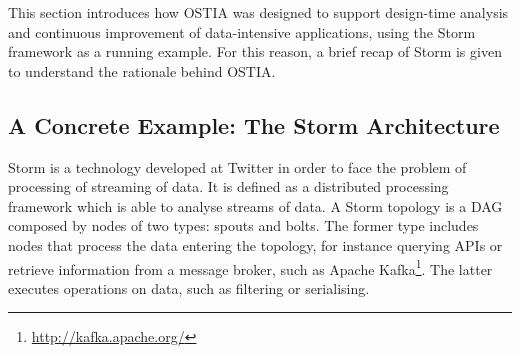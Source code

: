 

This section introduces how OSTIA was designed to support design-time analysis and continuous improvement of data-intensive applications, using the Storm framework as a running example.
For this reason, a brief recap of Storm is given to understand the rationale behind OSTIA.

\subsection{A Concrete Example: The Storm Architecture}

Storm is a technology developed at Twitter \cite{toshniwal2014storm} in order to
face the problem of processing of streaming of data. It is defined as a
distributed processing framework which is able to analyse streams of data. A Storm topology is a DAG composed by nodes of two types: spouts and bolts. The former type includes nodes that process the data entering the topology, for instance
querying APIs or retrieve information from a message broker, such as Apache
Kafka\footnote{\url{http://kafka.apache.org/}}. The latter executes operations on data, such as filtering or serialising.



